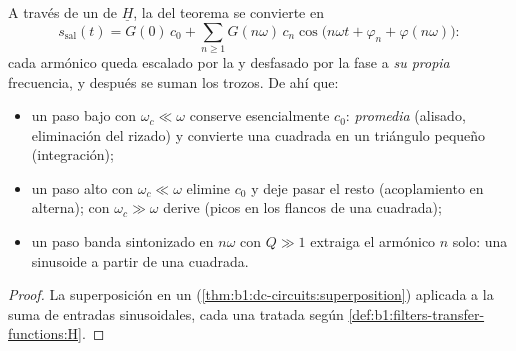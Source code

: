 \begin{proposition}\label{prop:b1:filters-transfer-functions:filtering}
A través de un  de  $\underline H$, la 
del teorema se convierte en
\[
s_{\text{sal}}(t) = G(0)\,c_0 + \sum_{n \geq 1} G(n\omega)\,c_n\cos\!\big(n\omega t + \varphi_n + \varphi(n\omega)\big):
\]
cada armónico queda escalado por la  y desfasado por la fase a
\emph{su propia} frecuencia, y después se suman los trozos. De ahí que:
\begin{itemize}
  \item un paso bajo con $\omega_c \ll \omega$ conserve esencialmente
        $c_0$: \emph{promedia} (alisado, eliminación del rizado) y
        convierte una  cuadrada en un triángulo pequeño (integración);
  \item un paso alto con $\omega_c \ll \omega$ elimine $c_0$ y deje pasar
        el resto (acoplamiento en alterna); con $\omega_c \gg \omega$
        derive (picos en los flancos de una  cuadrada);
  \item un paso banda sintonizado en $n\omega$ con $Q \gg 1$ extraiga el
        armónico $n$ solo: una sinusoide a partir de una  cuadrada.
\end{itemize}
\end{proposition}

\begin{proof}
La superposición en un  (\cref{thm:b1:dc-circuits:superposition})
aplicada a la suma de entradas sinusoidales, cada una tratada según
\cref{def:b1:filters-transfer-functions:H}.
\end{proof}

